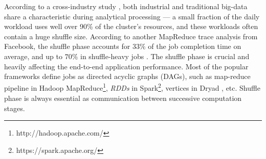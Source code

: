 {\color{black}
According to a cross-industry study \cite{chen2012interactive}, both industrial and traditional big-data share a characteristic during analytical processing --- a small fraction of the daily workload uses well over 90\% of the cluster’s resources, and these workloads often contain a huge shuffle size. 
According to another MapReduce trace analysis from Facebook, the shuffle phase accounts for $33\%$ of the job completion time on average, and up to $70\%$ in shuffle-heavy jobs \cite{managing}.
The shuffle phase is crucial and heavily affecting the end-to-end application performance.
Most of the popular frameworks define jobs as directed acyclic graphs (DAGs), such as map-reduce pipeline in Hadoop MapReduce\footnote{http://hadoop.apache.com/}, \textit{RDDs} in Spark\footnote{https://spark.apache.org/}, vertices in Dryad \cite{dryad}, etc.
Shuffle phase is always essential as communication between successive computation stages.
}

